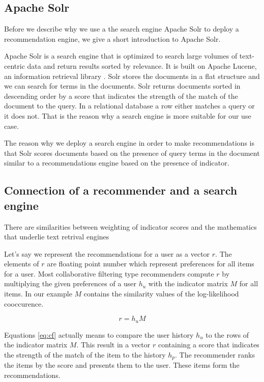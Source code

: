 \subsection{Apache Solr}
\label{sec:solr}

Before we describe why we use a the search engine Apache Solr to deploy a recommendation engine, we give a short introduction to Apache Solr.

Apache Solr is a search engine that is optimized to search large volumes of text-centric data and return results sorted by relevance. It is built on Apache Lucene, an information retrieval library \cite{grainger}. Solr stores the documents in a flat structure and we can search for terms in the documents.
Solr returns documents sorted in descending order by a score that indicates the strength of the match of the document to the query. In a relational database a row either matches a query or it does not. That is the reason why a search engine is more suitable for our use case.

The reason why we deploy a search engine in order to make recommendations is that Solr scores documents based on the presence of query terms in the document similar to a recommendations engine based on the presence of indicator.

\subsection{Connection of a recommender and a search engine}
\label{sec:relation}

There are similarities between weighting of indicator scores and the mathematics that underlie text retrival engines

Let's say we represent the recommendations for a user as a vector $r$. The elements of $r$ are floating point number which represent preferences for all items for a user. Most collaborative filtering type recommenders compute $r$ by multiplying the given preferences of a user $h_u$ with the indicator matrix $M$ for all items. In our example $M$ contains the similarity values of the log-likelihood cooccurence.

\begin{equation}
  \label{eq:cf}
  r = h_u M
\end{equation}

Equations \ref{eq:cf} actually means to compare the user history $h_u$ to the rows of the indicator matrix $M$. This result in a vector $r$ containing a score that indicates the strength of the match of the item to the history $h_p$. The recommender ranks the items by the score and presents them to the user. These items form the recommendations.

